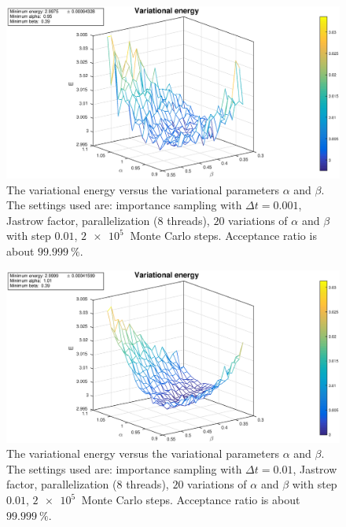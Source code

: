 \documentclass[a4paper,twoside,11pt]{book}
\begin{document}
\begin{figure}%
	\centering
	\includegraphics[width=\textwidth]{2e-rep_imp_small}
	\caption{The variational energy versus the variational parameters $\alpha$ and $\beta$. The settings used are: importance sampling with $\Delta t = 0.001$, Jastrow factor, parallelization (8 threads), $20$ variations of $\alpha$ and $\beta$ with step $0.01$, $\SI{2e5}{}$ Monte Carlo steps. Acceptance ratio is about $\SI{99.999}{\percent}$.}
	\label{fig:2e-rep_imp_small}
\end{figure}
\begin{figure}%
	\centering
	\includegraphics[width=\textwidth]{2e-rep_imp_med}
	\caption{The variational energy versus the variational parameters $\alpha$ and $\beta$. The settings used are: importance sampling with $\Delta t = 0.01$, Jastrow factor, parallelization (8 threads), $20$ variations of $\alpha$ and $\beta$ with step $0.01$, $\SI{2e5}{}$ Monte Carlo steps. Acceptance ratio is about $\SI{99.999}{\percent}$.}
	\label{fig:2e-rep_imp_med}
\end{figure}
\end{document}
